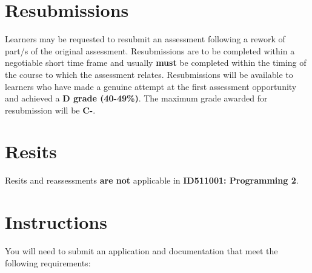 \documentclass{article}
\begin{document}
\section*{Resubmissions}
Learners may be requested to resubmit an assessment following a rework of part/s of the original assessment. Resubmissions are to be completed within a negotiable short time frame and usually \textbf{must} be completed within the timing of the course to which the assessment relates. Resubmissions will be available to learners who have made a genuine attempt at the first assessment opportunity and achieved a \textbf{D grade (40-49\%)}. The maximum grade awarded for resubmission will be \textbf{C-}.

\section*{Resits}
Resits and reassessments \textbf{are not} applicable in \textbf{ID511001: Programming 2}.

\section*{Instructions}
You will need to submit an application and documentation that meet the following requirements:\\
\end{document}
